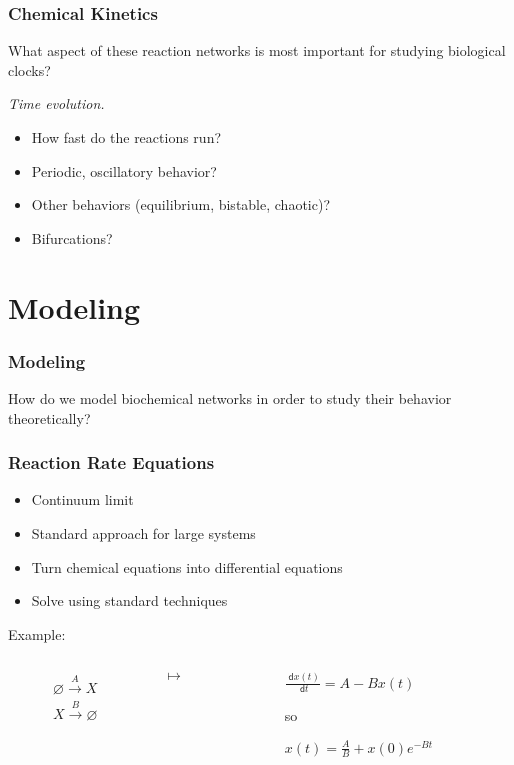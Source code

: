 \documentclass[xcolor={usenames,dvipsnames,svgnames}]{beamer}
\newcommand{\dee}{\;\mathsf{d}}
\begin{document}
\begin{frame}
    \frametitle{Chemical Kinetics}
    What aspect of these reaction networks is most important for studying biological clocks?
    \pause

    \emph{Time evolution.}
    \begin{itemize}
        \item How fast do the reactions run?
        \item Periodic, oscillatory behavior?
        \item Other behaviors (equilibrium, bistable, chaotic)?
        \item Bifurcations?
    \end{itemize}
\end{frame}


\section{Modeling} %
\label{sec:modeling}

\begin{frame}
    \frametitle{Modeling}
    How do we model biochemical networks in order to study their behavior theoretically?
\end{frame}

\begin{frame}
    \frametitle{Reaction Rate Equations}
    \begin{itemize}
        \item Continuum limit
        \item Standard approach for large systems
        \item Turn chemical equations into differential equations
        \item Solve using standard techniques
    \end{itemize}
    \pause
    Example:
    \begin{columns}[c]
        \begin{column}{0.45\textwidth}
            \begin{align*}
                \varnothing \xrightarrow{A} X \\
                X \xrightarrow {B} \varnothing
            \end{align*}
        \end{column}
        \begin{column}{0.1\textwidth}
            \huge $\mapsto$
        \end{column}
        \begin{column}{0.45\textwidth}
            \begin{center}
                $\frac{\dee x(t)}{\dee t} = A - B x(t)$

                so

                $x(t) = \frac{A}{B} + x(0) e^{-B t}$
            \end{center}
        \end{column}
    \end{columns}
\end{frame}
\end{document}
